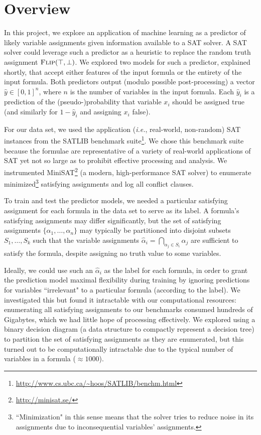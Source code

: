 \documentclass{article}
\begin{document}
\section*{Overview}

In this project, we explore an application of machine learning as a predictor of
likely variable assignments given information available to a SAT solver. A SAT
solver could leverage such a predictor as a heuristic to replace the random
truth assignment $\textsc{Flip}(\top, \bot)$. We explored two models for such a
predictor, explained shortly, that accept either features of the input formula
or the entirety of the input formula. Both predictors output (modulo possible
post-processing) a vector $\widehat{y} \in [0, 1]^n$, where $n$ is the number of
variables in the input formula. Each $\widehat{y}_i$ is a prediction of the
(pseudo-)probability that variable $x_i$ should be assigned true (and similarly
for $1 - \widehat{y}_i$ and assigning $x_i$ false).

For our data set, we used the application (\textit{i.e.}, real-world,
non-random) SAT instances from the SATLIB benchmark
suite\footnote{\url{http://www.cs.ubc.ca/~hoos/SATLIB/benchm.html}}. We chose
this benchmark suite because the formulae are representative of a variety of
real-world applications of SAT yet not so large as to prohibit effective
processing and analysis. We instrumented
MiniSAT\footnote{\url{http://minisat.se/}} (a modern, high-performance SAT
solver) to enumerate minimized\footnote{``Minimization" in this sense means that
the solver tries to reduce noise in its assignments due to inconsequential
variables' assignments.} satisfying assignments and log all conflict clauses.

To train and test the predictor models, we needed a particular satisfying
assignment for each formula in the data set to serve as its label. A formula's
satisfying assignments may differ significantly, but the set of satisfying
assignments $\{ \alpha_1, \ldots, \alpha_n \}$ may typically be partitioned into
disjoint subsets $S_1, \ldots, S_k$ such that the variable assignments
$\widehat{\alpha}_i = \bigcap_{\alpha_j \in S_i} \alpha_j$ are sufficient to
satisfy the formula, despite assigning no truth value to some variables.

Ideally, we could use such an $\widehat{\alpha}_i$ as the label for each
formula, in order to grant the prediction model maximal flexibility during
training by ignoring predictions for variables ``irrelevant" to a particular
formula (according to the label). We investigated this but found it intractable
with our computational resources: enumerating all satisfying assignments to our
benchmarks consumed hundreds of Gigabytes, which we had little hope of
processing effectively. We explored using a binary decision diagram (a data
structure to compactly represent a decision tree) to partition the set of
satisfying assignments as they are enumerated, but this turned out to be
computationally intractable due to the typical number of variables in a
formula ($\approx 1000$).
\end{document}
